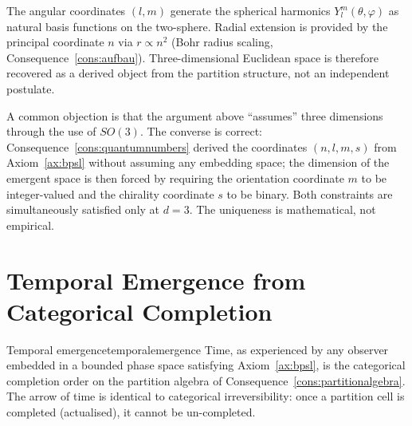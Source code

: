 \begin{corollary}\label{cor:spatialreps}
The angular coordinates $(l,m)$ generate the spherical harmonics $Y_{l}^{m}(\theta,\varphi)$ as natural basis functions on the two-sphere. Radial extension is provided by the principal coordinate $n$ via $r\propto n^{2}$ (Bohr radius scaling, Consequence~\ref{cons:aufbau}). Three-dimensional Euclidean space is therefore recovered as a derived object from the partition structure, not an independent postulate.
\end{corollary}

\begin{remark}
A common objection is that the argument above ``assumes'' three dimensions through the use of $SO(3)$. The converse is correct: Consequence~\ref{cons:quantumnumbers} derived the coordinates $(n,l,m,s)$ from Axiom~\ref{ax:bpsl} without assuming any embedding space; the dimension of the emergent space is then forced by requiring the orientation coordinate $m$ to be integer-valued and the chirality coordinate $s$ to be binary. Both constraints are simultaneously satisfied only at $d=3$. The uniqueness is mathematical, not empirical.
\end{remark}

\section{Temporal Emergence from Categorical Completion}
\label{sec:temporalemergence}

\begin{consequence}{Temporal emergence}{temporalemergence}
Time, as experienced by any observer embedded in a bounded phase space satisfying Axiom~\ref{ax:bpsl}, is the categorical completion order on the partition algebra of Consequence~\ref{cons:partitionalgebra}. The arrow of time is identical to categorical irreversibility: once a partition cell is completed (actualised), it cannot be un-completed.
\end{consequence}

